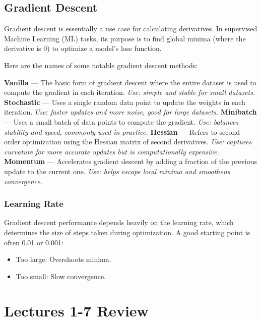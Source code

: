 \subsection{Gradient Descent}
Gradient descent \cite{goodfellow2016deep} is essentially a use case for calculating derivatives. In supervised Machine Learning (ML) tasks, its purpose is to find global minima (where the derivative is 0) to optimize a model's loss function. %

Here are the names of some notable gradient descent methods:
\begin{outline}
    \1 \textbf{Vanilla} — The basic form of gradient descent where the entire dataset is used to compute the gradient in each iteration. \textit{Use: simple and stable for small datasets.}
    \1 \textbf{Stochastic} — Uses a single random data point to update the weights in each iteration. \textit{Use: faster updates and more noise, good for large datasets.}
    \1 \textbf{Minibatch} — Uses a small batch of data points to compute the gradient. \textit{Use: balances stability and speed, commonly used in practice.}
    \1 \textbf{Hessian} — Refers to second-order optimization using the Hessian matrix of second derivatives. \textit{Use: captures curvature for more accurate updates but is computationally expensive.}
    \1 \textbf{Momentum} — Accelerates gradient descent by adding a fraction of the previous update to the current one. \textit{Use: helps escape local minima and smoothens convergence.}
\end{outline}


\subsubsection{Learning Rate}
Gradient descent performance depends heavily on the learning rate, which determines the size of steps taken during optimization. A good starting point is often 0.01 or 0.001:
\begin{itemize}
    \item Too large: Overshoots minima.
    \item Too small: Slow convergence.
\end{itemize}

\section{Lectures 1-7 Review}

